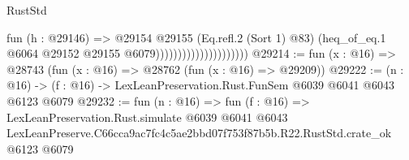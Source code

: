 \begin{lexlean}{RustStd}
\begin{coremodule}
                                          fun (h : @29146) =>
                                          @29154
                                            @29155
                                            (Eq.refl.{2} (Sort 1) @83)
                                            (heq_of_eq.{1}
                                              @6064
                                              @29152
                                              @29155
                                              @6079)))))))))))))))))))))
@29214 := fun (x : @16) => @28743 (fun (x : @16) => @28762 (fun (x : @16) => @29209))
@29222 := (n : @16) -> (f : @16) -> LexLeanPreservation.Rust.FunSem @6039 @6041 @6043 @6123 @6079
@29232 := fun (n : @16) =>
  fun (f : @16) =>
  LexLeanPreservation.Rust.simulate
    @6039
    @6041
    @6043
    LexLeanPreserve.C66cca9ac7fc4c5ae2bbd07f753f87b5b.R22.RustStd.crate_ok
    @6123
    @6079
\end{coremodule}
\end{lexlean}
